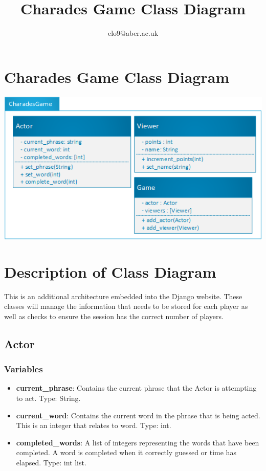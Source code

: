 \documentclass{article}
\title{Charades Game Class Diagram}
\author{elo9@aber.ac.uk}
\begin{document}
\maketitle
\tableofcontents

\newpage

\section{Charades Game Class Diagram}
\includegraphics[width=\textwidth]{CharadesGameClass}


\section{Description of Class Diagram}
This is an additional architecture embedded into the Django website. These classes will manage the information that needs to be stored for each player as well as checks to ensure the session has the correct number of players. 

\subsection{Actor}
\subsubsection{Variables}
\begin{itemize}

	\item \textbf{current\_phrase}: Contains the current phrase that the Actor is attempting to act. Type: String.

	\item \textbf{current\_word}: Contains the current word in the phrase that is being acted. This is an integer that relates to word. Type: int.
	
	\item \textbf{completed\_words}: A list of integers representing the words that have been completed. A word is completed when it correctly guessed or time has elapsed. Type: int list.
	
\end{itemize}
\end{document}
